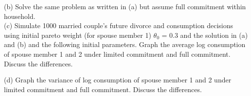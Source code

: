 \documentclass[paper=a4, fontsize=13pt]{extarticle} %
\numberwithin{equation}{section} %
\numberwithin{figure}{section} %
\numberwithin{table}{section} %
\begin{document}
(b) Solve the same problem as written in (a) but assume full commitment within household.\\

\vspace{0.2in}
(c) Simulate 1000 married couple's future divorce and consumption decisions using initial pareto weight (for spouse member 1) $\theta_0$ = 0.3 and the solution in (a) and (b) and the following initial parameters. Graph the average log consumption of spouse member 1 and 2 under limited commitment and full commitment. Discuss the differences.

\vspace{0.2in}
(d) Graph the variance of log consumption of spouse member 1 and 2 under limited commitment and full commitment. Discuss the differences.
\end{document}
